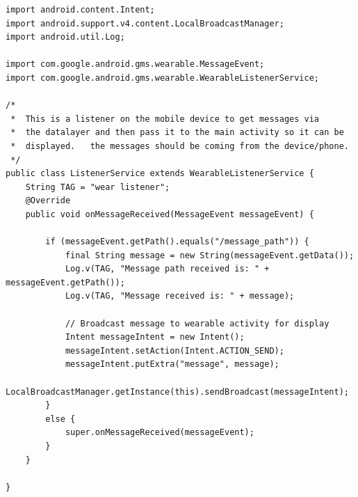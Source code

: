 \documentclass[12pt]{book}
\numberwithin{equation}{section}
\begin{document}
\begin{appendices}
\begin{verbatim}
import android.content.Intent;
import android.support.v4.content.LocalBroadcastManager;
import android.util.Log;

import com.google.android.gms.wearable.MessageEvent;
import com.google.android.gms.wearable.WearableListenerService;

/*
 *  This is a listener on the mobile device to get messages via
 *  the datalayer and then pass it to the main activity so it can be
 *  displayed.   the messages should be coming from the device/phone.
 */
public class ListenerService extends WearableListenerService {
    String TAG = "wear listener";
    @Override
    public void onMessageReceived(MessageEvent messageEvent) {

        if (messageEvent.getPath().equals("/message_path")) {
            final String message = new String(messageEvent.getData());
            Log.v(TAG, "Message path received is: " + messageEvent.getPath());
            Log.v(TAG, "Message received is: " + message);

            // Broadcast message to wearable activity for display
            Intent messageIntent = new Intent();
            messageIntent.setAction(Intent.ACTION_SEND);
            messageIntent.putExtra("message", message);
            LocalBroadcastManager.getInstance(this).sendBroadcast(messageIntent);
        }
        else {
            super.onMessageReceived(messageEvent);
        }
    }

}

\end{verbatim}

\end{appendices}
\end{document}
